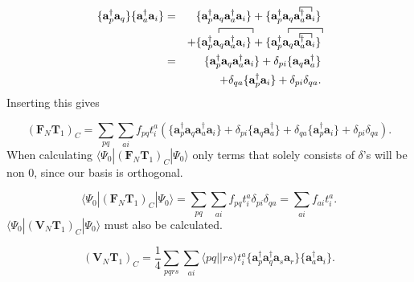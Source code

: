 \documentclass[a4paper,norsk,11pt,twoside]{report}
\begin{document}
\begin{align}
\{ \textbf{a}^{\dag}_p \textbf{a}_q\}  \{\textbf{a}^{\dag}_a \textbf{a}_i \} & = &
\{ \textbf{a}^{\dag}_p \textbf{a}_q \textbf{a}^{\dag}_a \textbf{a}_i \} + \{ \textbf{a}^{\dag}_p
\contraction{}{\textbf{a}_q}{}{\textbf{a}^{\dag}_a}
\textbf{a}_q \textbf{a}^{\dag}_a
\textbf{a}_i \}  \\ & &
+  \{
\contraction{}{\textbf{a}^{\dag}_p}{ \textbf{a}_q \textbf{a}^{\dag}_a}{\textbf{a}_i}
\textbf{a}^{\dag}_p \textbf{a}_q \textbf{a}^{\dag}_a \textbf{a}_i \} 
+ \{
\contraction{}{\textbf{a}^{\dag}_p}{\textbf{a}_q \textbf{a}^{\dag}_a}{\textbf{a}_i}
\contraction{\textbf{a}^{\dag}_p}{\textbf{a}_q}{} {\textbf{a}^{\dag}_a}
\textbf{a}^{\dag}_p \textbf{a}_q \textbf{a}^{\dag}_a \textbf{a}_i \} \nonumber \\ & = &
\{ \textbf{a}^{\dag}_p \textbf{a}_q \textbf{a}^{\dag}_a \textbf{a}_i \} + \delta_{pi} \{\textbf{a}_q \textbf{a}_a^{\dag} \} \nonumber \\ & &
+ \delta_{qa} \{\textbf{a}_p^{\dag} \textbf{a}_i \} 
+ \delta_{pi} \delta_{qa} . \nonumber
\end{align}
Inserting this gives 

\begin{equation}
(\textbf{F}_N \textbf{T}_1)_C = \sum_{pq} \sum_{ai} f_{pq} t_i^a \left(\{ \textbf{a}^{\dag}_p \textbf{a}_q \textbf{a}^{\dag}_a \textbf{a}_i \} + \delta_{pi} \{\textbf{a}_q \textbf{a}_a^{\dag} \} 
+ \delta_{qa} \{\textbf{a}_p^{\dag} \textbf{a}_i \} 
+ \delta_{pi} \delta_{qa} \right) .
\end{equation}
When calculating $\langle \Psi_0 | (\textbf{F}_N \textbf{T}_1)_C | \Psi_0 \rangle$ only terms that solely consists of $\delta$'s will be non 0, since our basis is orthogonal. 

\begin{equation}
\langle \Psi_0 | (\textbf{F}_N \textbf{T}_1)_C | \Psi_0 \rangle =  \sum_{pq} \sum_{ai} f_{pq} t_i^a\delta_{pi} \delta_{qa} = \sum_{ai} f_{ai} t_i^a . \label{f_t1}
\end{equation}
$\langle \Psi_0 | (\textbf{V}_N \textbf{T}_1)_C | \Psi_0 \rangle$ must also be calculated.

\begin{equation}
(\textbf{V}_N \textbf{T}_1 )_C = \frac{1}{4} \sum_{pqrs} \sum_{ai} \langle pq||rs \rangle t_i^a \{\textbf{a}^{\dag}_p \textbf{a}^{\dag}_q \textbf{a}_s \textbf{a}_r \} \{\textbf{a}_a^{\dag} \textbf{a}_i \} .
\end{equation}
\end{document}
